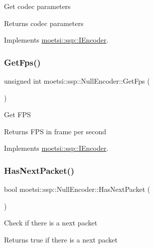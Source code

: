 Get codec parameters \begin{DoxyReturn}{Returns}
codec parameters 
\end{DoxyReturn}


Implements \hyperlink{classmoetsi_1_1ssp_1_1IEncoder_ad5179efaa4c74207766dd64f46f4059a}{moetsi\+::ssp\+::\+I\+Encoder}.

\mbox{\label{classmoetsi_1_1ssp_1_1NullEncoder_ad6727fa08528622081aa4eca4aacc6c1}} 
\subsubsection{\texorpdfstring{Get\+Fps()}{GetFps()}}
{\footnotesize\ttfamily unsigned int moetsi\+::ssp\+::\+Null\+Encoder\+::\+Get\+Fps (\begin{DoxyParamCaption}{ }\end{DoxyParamCaption})\hspace{0.3cm}{\ttfamily [virtual]}}

Get F\+PS \begin{DoxyReturn}{Returns}
F\+PS in frame per second 
\end{DoxyReturn}


Implements \hyperlink{classmoetsi_1_1ssp_1_1IEncoder_ae6a865aa52230d81aed1cb5232402f6c}{moetsi\+::ssp\+::\+I\+Encoder}.

\mbox{\label{classmoetsi_1_1ssp_1_1NullEncoder_a359eb668c16a1ef7963214f7f6303af4}} 
\subsubsection{\texorpdfstring{Has\+Next\+Packet()}{HasNextPacket()}}
{\footnotesize\ttfamily bool moetsi\+::ssp\+::\+Null\+Encoder\+::\+Has\+Next\+Packet (\begin{DoxyParamCaption}{ }\end{DoxyParamCaption})\hspace{0.3cm}{\ttfamily [virtual]}}

Check if there is a next packet \begin{DoxyReturn}{Returns}
true if there is a next packet 
\end{DoxyReturn}


